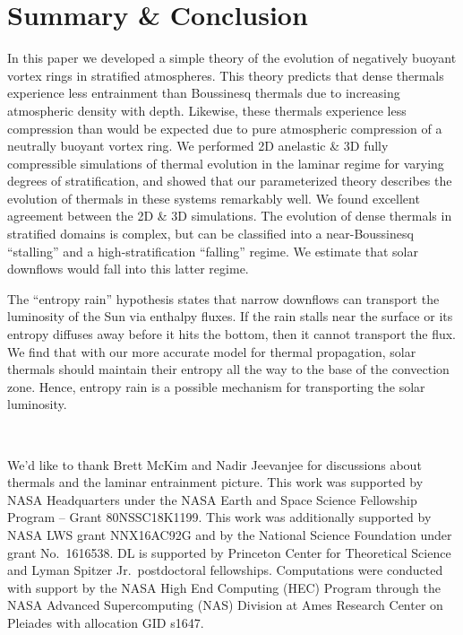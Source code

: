 \documentclass[twocolumn, amsmath, amsfonts, amssymb, trackchanges]{aastex62}
\begin{document}
\section{Summary \& Conclusion}
\label{sec:discussion}
In this paper we developed a simple theory of the evolution of negatively buoyant vortex rings in stratified atmospheres.
This theory predicts that dense thermals experience less entrainment than Boussinesq thermals due to increasing atmospheric density with depth.
Likewise, these thermals experience less compression than would be expected due to pure atmospheric compression of a neutrally buoyant vortex ring.
We performed 2D anelastic \& 3D fully compressible simulations of thermal evolution in the laminar regime for varying degrees of stratification, and showed that our parameterized theory describes the evolution of thermals in these systems remarkably well.
We found excellent agreement between the 2D \& 3D simulations.
The evolution of dense thermals in stratified domains is complex, but can be classified into a near-Boussinesq ``stalling'' and a high-stratification ``falling'' regime.
We estimate that solar downflows would fall into this latter regime.

The ``entropy rain'' hypothesis states that narrow downflows can transport the luminosity of the Sun via enthalpy fluxes.
If the rain stalls near the surface or its entropy diffuses away before it hits the bottom, then it cannot transport the flux.
We find that with our more accurate model for thermal propagation, solar thermals should maintain their entropy all the way to the base of the convection zone.
Hence, entropy rain is a possible mechanism for transporting the solar luminosity.

$\,$\newline$\,$
\begin{acknowledgements}
We'd like to thank Brett McKim and Nadir Jeevanjee for discussions about thermals and the laminar entrainment picture.
This work was supported by NASA Headquarters under the NASA Earth and Space Science Fellowship Program -- Grant 80NSSC18K1199.
This work was additionally supported by NASA LWS grant NNX16AC92G and by the National Science Foundation under grant No.~1616538. 
DL is supported by Princeton Center for Theoretical Science and Lyman Spitzer Jr.~postdoctoral fellowships.
Computations were conducted with support by the NASA High End Computing (HEC) Program through the NASA  Advanced Supercomputing (NAS) Division at Ames Research Center on Pleiades with allocation GID s1647.
\end{acknowledgements}
\end{document}
